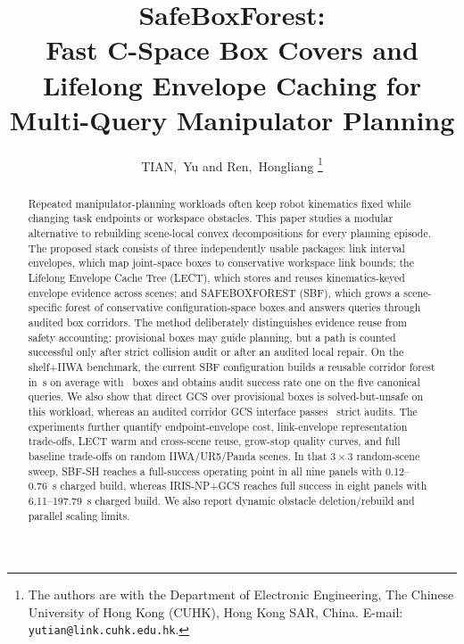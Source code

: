 \documentclass[journal]{IEEEtran}
\DeclareRobustCommand{\textsc}[1]{\textnormal{\MakeUppercase{#1}}}
\begin{document}
\title{SafeBoxForest:\\ Fast C-Space Box Covers and Lifelong Envelope Caching
for Multi-Query Manipulator Planning}

\author{TIAN,~Yu and Ren,~Hongliang%
\thanks{The authors are with the Department of Electronic Engineering,
The Chinese University of Hong Kong (CUHK), Hong Kong SAR, China.
E-mail: \texttt{yutian@link.cuhk.edu.hk}.}}

\maketitle

\begin{abstract}
Repeated manipulator-planning workloads often keep robot kinematics fixed while
changing task endpoints or workspace obstacles. This paper studies a modular
alternative to rebuilding scene-local convex decompositions for every planning
episode. The proposed stack consists of three independently usable packages:
link interval envelopes, which map joint-space boxes to conservative workspace
link bounds; the Lifelong Envelope Cache Tree (LECT), which stores and reuses
kinematics-keyed envelope evidence across scenes; and \textsc{SafeBoxForest}
(SBF), which grows a scene-specific forest of conservative configuration-space
boxes and answers queries through audited box corridors. The method deliberately
distinguishes evidence reuse from safety accounting: provisional boxes may guide
planning, but a path is counted successful only after strict collision audit or
after an audited local repair. On the shelf+IIWA benchmark, the current SBF
configuration builds a reusable corridor forest in \TroSbfBuildMean\,s on
average with \TroSbfBoxMean\ boxes and obtains audit success rate one on the
five canonical queries. We also show that direct GCS over provisional boxes is
solved-but-unsafe on this workload, whereas an audited corridor GCS interface
passes \TroAuditedGcsAuditPass\ strict audits. The experiments further quantify
endpoint-envelope cost, link-envelope representation trade-offs, LECT warm and
cross-scene reuse, grow-stop quality curves, and full baseline trade-offs on
random IIWA/UR5/Panda scenes. In that $3\times 3$ random-scene sweep, SBF-SH
reaches a full-success operating point in all nine panels with 0.12--0.76~s
charged build, whereas IRIS-NP+GCS reaches full success in eight panels with
6.11--197.79~s charged build. We also report dynamic obstacle
deletion/rebuild and parallel scaling limits.
\end{abstract}
\end{document}
